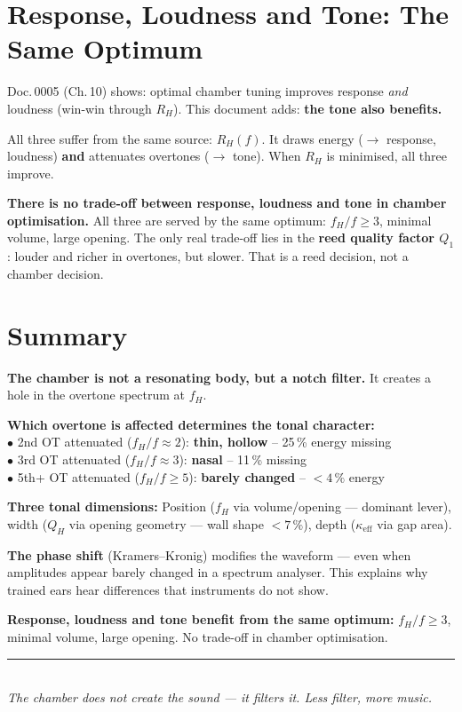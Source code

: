 \documentclass[11pt,a4paper]{article}
\begin{document}
\section{Response, Loudness and Tone: The Same Optimum}

Doc.\,0005 (Ch.\,10) shows: optimal chamber tuning improves response \textit{and} loudness (win-win through $R_H$). This document adds: \textbf{the tone also benefits.}

All three suffer from the same source: $R_H(f)$. It draws energy ($\to$ response, loudness) \textbf{and} attenuates overtones ($\to$ tone). When $R_H$ is minimised, all three improve.

\begin{keybox}
\textbf{There is no trade-off between response, loudness and tone in chamber optimisation.} All three are served by the same optimum: $f_H/f \geq 3$, minimal volume, large opening. The only real trade-off lies in the \textbf{reed quality factor $Q_1$}: louder and richer in overtones, but slower. That is a reed decision, not a chamber decision.
\end{keybox}


\section{Summary}

\begin{keybox}
\textbf{The chamber is not a resonating body, but a notch filter.} It creates a hole in the overtone spectrum at $f_H$.

\textbf{Which overtone is affected determines the tonal character:}\\
$\bullet$ 2nd OT attenuated ($f_H/f \approx 2$): \textbf{thin, hollow} -- 25\,\% energy missing\\
$\bullet$ 3rd OT attenuated ($f_H/f \approx 3$): \textbf{nasal} -- 11\,\% missing\\
$\bullet$ 5th+ OT attenuated ($f_H/f \geq 5$): \textbf{barely changed} -- $< 4\,\%$ energy

\textbf{Three tonal dimensions:} Position ($f_H$ via volume/opening --- dominant lever), width ($Q_H$ via opening geometry --- wall shape $< 7\,\%$), depth ($\kappa_\text{eff}$ via gap area).

\textbf{The phase shift} (Kramers--Kronig) modifies the waveform --- even when amplitudes appear barely changed in a spectrum analyser. This explains why trained ears hear differences that instruments do not show.

\textbf{Response, loudness and tone benefit from the same optimum:} $f_H/f \geq 3$, minimal volume, large opening. No trade-off in chamber optimisation.
\end{keybox}

\vspace{3mm}
\begin{center}
\textcolor{accentred}{\rule{0.6\textwidth}{1pt}}\\[4pt]
{\small\itshape The chamber does not create the sound --- it filters it. Less filter, more music.}
\end{center}
\end{document}
